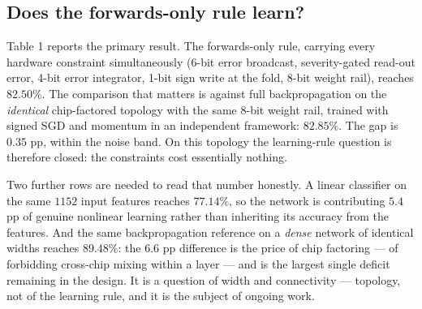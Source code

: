 \documentclass[11pt]{article}
\begin{document}
\hypertarget{does-the-forwards-only-rule-learn}{%
\subsection{Does the forwards-only rule
learn?}\label{does-the-forwards-only-rule-learn}}

Table 1 reports the primary result. The forwards-only rule, carrying
every hardware constraint simultaneously (6-bit error broadcast,
severity-gated read-out error, 4-bit error integrator, 1-bit sign write
at the fold, 8-bit weight rail), reaches \(82.50\%\). The comparison
that matters is against full backpropagation on the \emph{identical}
chip-factored topology with the same 8-bit weight rail, trained with
signed SGD and momentum in an independent framework: \(82.85\%\). The
gap is \(0.35\) pp, within the noise band. On this topology the
learning-rule question is therefore closed: the constraints cost
essentially nothing.

Two further rows are needed to read that number honestly. A linear
classifier on the same \(1152\) input features reaches \(77.14\%\), so
the network is contributing \(5.4\) pp of genuine nonlinear learning
rather than inheriting its accuracy from the features. And the same
backpropagation reference on a \emph{dense} network of identical widths
reaches \(89.48\%\): the \(6.6\) pp difference is the price of chip
factoring --- of forbidding cross-chip mixing within a layer --- and is
the largest single deficit remaining in the design. It is a question of
width and connectivity --- topology, not of the learning rule, and it is
the subject of ongoing work.
\end{document}
